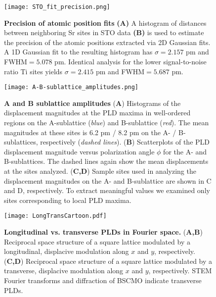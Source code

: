 \documentclass[12pt]{article}
\begin{document}
\clearpage

\begin{figure}
  \texttt{[image: STO\_fit\_precision.png]}
  \caption{\textbf{Precision of atomic position fits} 
\textbf{(A)} A histogram of distances between neighboring Sr sites in STO data \textbf{(B)} is used to estimate the precision of the atomic positions extracted via 2D Gaussian fits.
A 1D Gaussian fit to the resulting histogram has $\sigma=2.157$ pm and FWHM$=5.078$ pm.
Identical analysis for the lower signal-to-noise ratio Ti sites yields $\sigma=2.415$ pm and FWHM$=5.687$ pm.}
  \label{F:fit_precision}
\end{figure}

\clearpage

\begin{figure}
  \texttt{[image: A-B-sublattice\_amplitudes.png]}
  \caption{\textbf{A and B sublattice amplitudes} 
(\textbf{A}) Histograms of the displacement magnitudes at the PLD maxima in well-ordered regions on the A-sublattice (\textit{blue}) and B-sublattice (\textit{red}).  
The mean magnitudes at these sites is 6.2 pm / 8.2 pm on the A- / B-sublattices, respectively (\textit{dashed lines}).
(\textbf{B}) Scatterplots of the PLD displacement magnitude versus polarization angle $\phi$ for the A- and B-sublattices.  
The dashed lines again show the mean displacements at the sites analyzed.
(\textbf{C,D}) Sample sites used in analyzing the displacement magnitudes on the A- and B-sublattice are shown in C and D, respectively. 
To extract meaningful values we examined only sites corresponding to local PLD maxima.}
  \label{F:sublattice_amplitudes}
\end{figure}

\clearpage

\begin{figure}
  \texttt{[image: LongTransCartoon.pdf]}
  \caption{\textbf{Longitudinal vs. transverse PLDs in Fourier space.} 
(\textbf{A,B}) Reciprocal space structure of a square lattice modulated by a longitudinal, displacive modulation along $x$ and $y$, respectively.
(\textbf{C,D}) Reciprocal space structure of a square lattice modulated by a transverse, displacive modulation along $x$ and $y$, respectively.
STEM Fourier transforms and diffraction of BSCMO indicate transverse PLDs.}
  \label{F:TransLong}
\end{figure}

\clearpage
\end{document}
